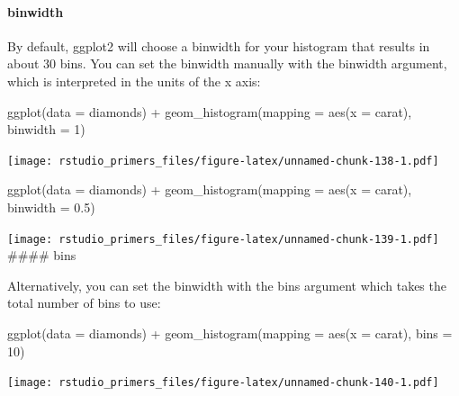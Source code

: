 \documentclass[
]{article}
\newenvironment{Shaded}{\begin{snugshade}}{\end{snugshade}}
\newcommand{\AttributeTok}[1]{\textcolor[rgb]{0.77,0.63,0.00}{#1}}
\newcommand{\DecValTok}[1]{\textcolor[rgb]{0.00,0.00,0.81}{#1}}
\newcommand{\FloatTok}[1]{\textcolor[rgb]{0.00,0.00,0.81}{#1}}
\newcommand{\FunctionTok}[1]{\textcolor[rgb]{0.00,0.00,0.00}{#1}}
\newcommand{\NormalTok}[1]{#1}
\newcommand{\SpecialCharTok}[1]{\textcolor[rgb]{0.00,0.00,0.00}{#1}}
\begin{document}
\hypertarget{binwidth}{%
\paragraph{binwidth}\label{binwidth}}

By default, ggplot2 will choose a binwidth for your histogram that
results in about 30 bins. You can set the binwidth manually with the
binwidth argument, which is interpreted in the units of the x axis:

\begin{Shaded}
\begin{Highlighting}[]
\FunctionTok{ggplot}\NormalTok{(}\AttributeTok{data =}\NormalTok{ diamonds) }\SpecialCharTok{+}
  \FunctionTok{geom\_histogram}\NormalTok{(}\AttributeTok{mapping =} \FunctionTok{aes}\NormalTok{(}\AttributeTok{x =}\NormalTok{ carat), }\AttributeTok{binwidth =} \DecValTok{1}\NormalTok{)}
\end{Highlighting}
\end{Shaded}

\texttt{[image: rstudio\_primers\_files/figure-latex/unnamed-chunk-138-1.pdf]}

\begin{Shaded}
\begin{Highlighting}[]
\FunctionTok{ggplot}\NormalTok{(}\AttributeTok{data =}\NormalTok{ diamonds) }\SpecialCharTok{+}
  \FunctionTok{geom\_histogram}\NormalTok{(}\AttributeTok{mapping =} \FunctionTok{aes}\NormalTok{(}\AttributeTok{x =}\NormalTok{ carat), }\AttributeTok{binwidth =} \FloatTok{0.5}\NormalTok{)}
\end{Highlighting}
\end{Shaded}

\texttt{[image: rstudio\_primers\_files/figure-latex/unnamed-chunk-139-1.pdf]}
\#\#\#\# bins

Alternatively, you can set the binwidth with the bins argument which
takes the total number of bins to use:

\begin{Shaded}
\begin{Highlighting}[]
\FunctionTok{ggplot}\NormalTok{(}\AttributeTok{data =}\NormalTok{ diamonds) }\SpecialCharTok{+}
  \FunctionTok{geom\_histogram}\NormalTok{(}\AttributeTok{mapping =} \FunctionTok{aes}\NormalTok{(}\AttributeTok{x =}\NormalTok{ carat), }\AttributeTok{bins =} \DecValTok{10}\NormalTok{)}
\end{Highlighting}
\end{Shaded}

\texttt{[image: rstudio\_primers\_files/figure-latex/unnamed-chunk-140-1.pdf]}
\end{document}
